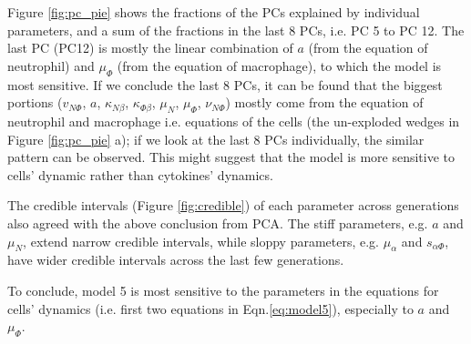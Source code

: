 Figure \ref{fig:pc_pie} shows the fractions of the PCs explained by individual parameters, and a sum of the fractions in the last 8 PCs, i.e. PC 5 to PC 12. The last PC (PC12) is mostly the linear combination of $a$ (from the equation of neutrophil) and $\mu_\Phi$ (from the equation of macrophage), to which the model is most sensitive. If we conclude the last 8 PCs, it can be found that the biggest portions ($v_{N\Phi}$, $a$, $\kappa_{N\beta}$, $\kappa_{\Phi\beta}$, $\mu_N$, $\mu_\Phi$, $\nu_{N\Phi}$) mostly come from the equation of neutrophil and macrophage i.e. equations of the cells (the un-exploded wedges in Figure \ref{fig:pc_pie} a); if we look at the last 8 PCs individually, the similar pattern can be observed. This might suggest that the model is more sensitive to cells' dynamic rather than cytokines' dynamics.

The credible intervals (Figure \ref{fig:credible}) of each parameter across generations also agreed with the above conclusion from PCA. The stiff parameters, e.g. $a$ and $\mu_N$, extend narrow credible intervals, while sloppy parameters, e.g. $\mu_\alpha$ and $s_{\alpha\Phi}$, have wider credible intervals across the last few generations.

To conclude, model 5 is most sensitive to the parameters in the equations for cells' dynamics (i.e. first two equations in Eqn.\ref{eq:model5}), especially to $a$ and $\mu_\Phi$.


